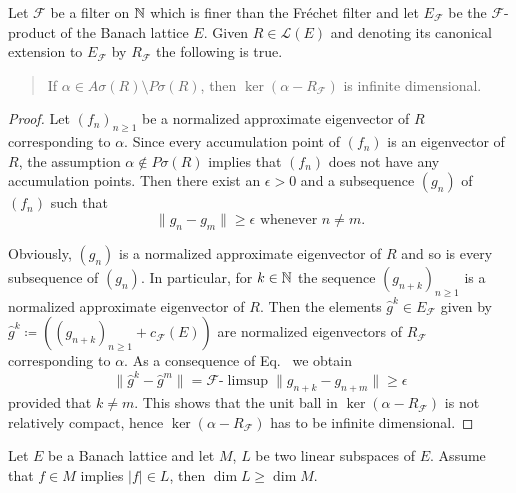 \begin{lemma}\label{lem:c3-3.10}
	
	Let $\mathcal{F}$ be a filter on $\mathbb{N}$ which is finer than the Fréchet filter and let $E_{\mathcal{F}}$ be the $\mathcal{F}$-product of the Banach lattice $E$.
	Given $R \in \mathcal{L}(E)$ and denoting its canonical extension to $E_{\mathcal{F}}$ by $R_{\mathcal{F}}$ the following is true.
\begin{quote}
	If\/ $\alpha \in A\sigma(R)\setminus P\sigma(R)$, then $\ker(\alpha - R_{\mathcal{F}})$ is infinite dimensional.
\end{quote}
\end{lemma}
\begin{proof}
    Let $(f_{n})_{n\geq 1}$ be a normalized approximate eigenvector of\/ $R$ corresponding to $\alpha$.
    Since every accumulation point of\/ $(f_{n})$ is an eigenvector of\/ $R$, the assumption $\alpha \notin P\sigma(R)$ implies that $(f_{n})$ does not have any accumulation points.
    Then there exist an $\epsilon > 0$ and a subsequence $(g_{n})$ of\/ $(f_{n})$ such that
    \begin{equation}\label{eq:c3-3.14}
        \|g_{n} - g_{m}\| \geq \epsilon \text{ whenever } n \neq m.
    \end{equation}
  
    Obviously, $(g_{n})$ is a normalized approximate eigenvector of\/ $R$ and so is every subsequence of\/ $(g_{n})$.
    In particular, for $k \in \mathbb{N}$ the sequence $(g_{n+k})_{n\geq 1}$ is a normalized approximate eigenvector of\/ $R$.
    Then the elements $\hat{g}^{k} \in E_{\mathcal{F}}$ given by $\hat{g}^{k} \coloneq ((g_{n+k})_{n\geq 1} + c_{\mathcal{F}}(E))$ are normalized eigenvectors of\/ $R_{\mathcal{F}}$ corresponding to $\alpha$.
    As a consequence of Eq.~ we obtain
\[
	\|\hat{g}^{k} - \hat{g}^{m}\| = \mathcal{F}\text{-}\limsup\|g_{n+k} - g_{n+m}\| \geq \epsilon
\]
%
provided that $k \neq m$.
    This shows that the unit ball in $\ker(\alpha - R_{\mathcal{F}})$ is not relatively compact, hence $\ker(\alpha - R_{\mathcal{F}})$ has to be infinite dimensional.
\end{proof}
\begin{lemma}\label{lem:c3-3.11}
	
	Let $E$ be a Banach lattice and let $M$, $L$ be two linear subspaces of\/ $E$.
	Assume that $f \in M$ implies $|f| \in L$, then $\dim L \geq \dim M$.
\end{lemma}
